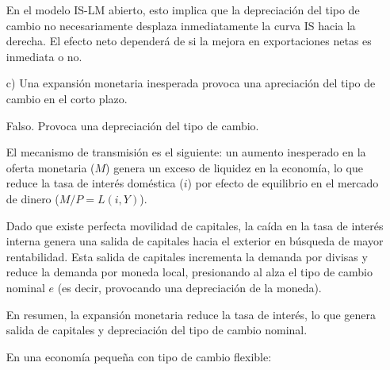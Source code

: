 \documentclass[a4paper]{article}
\begin{document}
\begin{enumerate}
\begin{solution}
    \medskip

    En el modelo IS-LM abierto, esto implica que la depreciación del tipo de cambio no necesariamente desplaza inmediatamente la curva IS hacia la derecha. El efecto neto dependerá de si la mejora en exportaciones netas es inmediata o no.
    \end{solution}

    \item[c)] Una expansión monetaria inesperada provoca una apreciación del tipo de cambio en el corto plazo.
    \begin{solution}
        Falso. Provoca una depreciación del tipo de cambio.

        El mecanismo de transmisión es el siguiente: un aumento inesperado en la oferta monetaria (\( M \)) genera un exceso de liquidez en la economía, lo que reduce la tasa de interés doméstica (\( i \)) por efecto de equilibrio en el mercado de dinero (\( M/P = L(i, Y) \)).

        \medskip

        Dado que existe perfecta movilidad de capitales, la caída en la tasa de interés interna genera una salida de capitales hacia el exterior en búsqueda de mayor rentabilidad. Esta salida de capitales incrementa la demanda por divisas y reduce la demanda por moneda local, presionando al alza el tipo de cambio nominal \( e \) (es decir, provocando una depreciación de la moneda).

        \medskip

        En resumen, la expansión monetaria reduce la tasa de interés, lo que genera salida de capitales y depreciación del tipo de cambio nominal.

        \medskip

        En una economía pequeña con tipo de cambio flexible:


\end{solution}
\end{enumerate}
\end{document}
